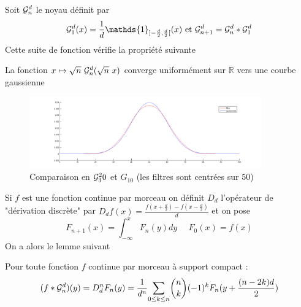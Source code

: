 Soit $\mathcal{G}_n^d$ le noyau définit par 
\begin{equation*}
\Gcal_1^d(x)=\frac{1}{d}\mathds{1}_{]-\frac{d}{2},\frac{d}{2}[}(x) \text{ et } \Gcal_{n+1}^d= \Gcal_n^d * \Gcal_1^d 
\label{formule_convol_n_int}
\end{equation*}
Cette suite de fonction vérifie la propriété suivante
\begin{prop}
La fonction $x\mapsto \sqrt{n}~\mathcal{G}_n^d(\sqrt{n}~x)$ converge uniformément sur $\mathbb{R}$ vers une courbe gaussienne 
\end{prop}
\begin{figure}
\centering
\includegraphics[width=10cm]{filtre_g3.png}
\caption{Comparaison en $\mathcal{G}_3^20$ et $G_10$ (les filtres sont centrées sur $50$)}
\end{figure}
Si $f$ est une fonction continue par morceau on définit $D_d$ l'opérateur de "dérivation discrète" par $D_d f(x)=\frac{f(x+\frac{d}{2})-f(x-\frac{d}{2})}{d}$  et on pose
\begin{equation*}
F_{n+1}(x)= \int_{-\infty}^{x}F_{n}(y)dy~~~~~~F_{0}(x)= f(x)
\end{equation*}
On a alors le lemme suivant 
\begin{prop} Pour toute fonction $f$ continue par morceau à support compact :
\begin{equation}
 (f*\mathcal{G}_n^d)(y)=D_d^n F_{n}(y)= \frac{1}{d^n}\underset{0 \le k\le n}{\sum} \binom{n}{k}(-1)^{k} F_{n}(y+\frac{(n-2k)d}{2})
\end{equation}
\end{prop}
